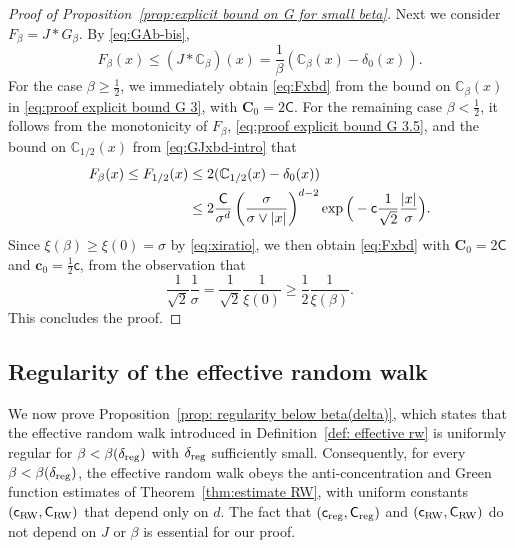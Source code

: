 \documentclass[11pt,a4paper]{article}
\numberwithin{equation}{section}
\theoremstyle{plain}
\theoremstyle{definition}
\newcommand\1{\mathds{1}}
\newcommand\bfco{\mathbf{c}_0}
\newcommand\bfCo{\mathbf{C}_0}
\newcommand\Crw{\mathsf{C}_{\textup{RW}}}
\newcommand\crw{\mathsf{c}_{\textup{RW}}}
\newcommand\CGreen{\mathsf{C}}
\newcommand\cGreen{\mathsf{c}}
\newcommand\creg{\mathsf{c}_{\textup{reg}}}
\newcommand\Creg{\mathsf{C}_{\textup{reg}}}
\newcommand{\deltareg}{\delta_{\textup{reg}}}
\begin{document}
\begin{proof}[Proof of Proposition~\textup{\ref{prop:explicit bound on G for small beta}}]
Next we consider $F_\beta = J*G_\beta$.  By \eqref{eq:GAb-bis},
\begin{equation}
\label{eq:proof explicit bound G 3.5}
	F_\beta(x)
    \leq
    (J* \mathbb C_{\beta})(x)
    =
    \frac{1}{\beta}(\mathbb C_{\beta}(x)-\delta_0(x)).
\end{equation}
For the case $\beta \ge \frac 12$, we immediately obtain \eqref{eq:Fxbd}
from the bound on $\mathbb C_{\beta}(x)$ in \eqref{eq:proof explicit bound G 3},
with $\bfCo=2\CGreen$.
For the remaining case $\beta < \frac 12$, it follows from
the monotonicity of $F_\beta$, \eqref{eq:proof explicit bound G 3.5}, and
the bound on $\mathbb C_{1/2}(x)$ from
\eqref{eq:GJxbd-intro} that
\begin{align}
\notag
	F_{\beta}(x)\leq F_{1/2}(x)&\leq 2 (\mathbb C_{1/2}(x)-\delta_0(x))
	\\&\leq 2\frac{\CGreen}{\sigma^d}\left( \frac{\sigma}{\sigma \vee|x| } \right)^{d-2}
\exp\Big(-\cGreen\frac{1}{\sqrt{2}}\frac{|x|}{\sigma} \Big).
\label{eq:proof explicit bound G 4}
\end{align}
Since $\xi(\beta) \ge \xi(0)=\sigma$ by \eqref{eq:xiratio},
we then obtain \eqref{eq:Fxbd} with $\bfCo=2\CGreen$ and
$\bfco=\frac 12 \cGreen$, from the observation that
\begin{equation}
    \frac{1}{\sqrt{2}}\frac{1}{\sigma}
    =
    \frac{1}{\sqrt{2}}\frac{1}{\xi(0)} \ge \frac 12 \frac{1}{\xi(\beta)}.
\end{equation}
This concludes the proof.
\end{proof}



\subsection{Regularity of the effective random walk}\label{section: regularity}
\label{sec:regularity-pf}



We now prove Proposition~\ref{prop: regularity below beta(delta)}, which states
that the effective random walk introduced in
Definition~\ref{def: effective rw} is uniformly regular for $\beta < \beta(\deltareg)$ with $\deltareg$ sufficiently small. Consequently, for every $ \beta< \beta(\deltareg)$,
the effective random walk
obeys the anti-concentration and Green function estimates of Theorem~\ref{thm:estimate RW}, with uniform constants $(\crw,\Crw)$ that depend only on $d$.
The fact that $(\creg,\Creg)$ and
$(\crw,\Crw)$ do not depend on  $J$ or $\beta$ is essential for our proof.
\end{document}
